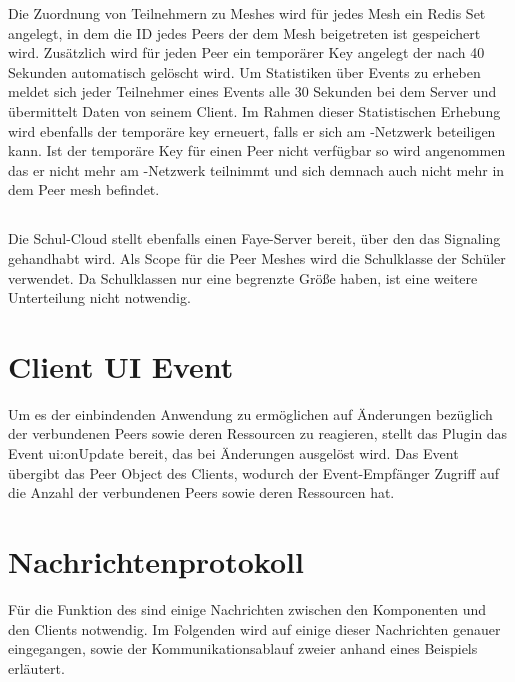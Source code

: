 \begin{description}
Die Zuordnung von Teilnehmern zu Meshes wird für jedes Mesh ein Redis Set angelegt, in dem die ID jedes Peers der dem Mesh beigetreten ist gespeichert wird. Zusätzlich wird für jeden Peer ein temporärer Key angelegt der nach 40 Sekunden automatisch gelöscht wird. Um Statistiken über Events zu erheben meldet sich jeder Teilnehmer eines Events alle 30 Sekunden bei dem Server und übermittelt Daten von seinem Client. Im Rahmen dieser Statistischen Erhebung wird ebenfalls der temporäre key erneuert, falls er sich am \pTp-Netzwerk beteiligen kann. Ist der temporäre Key für einen Peer nicht verfügbar so wird angenommen das er nicht mehr am \pTp-Netzwerk teilnimmt und sich demnach auch nicht mehr in dem Peer mesh befindet.

\subsection{\schulCloud}

Die Schul-Cloud stellt ebenfalls einen Faye-Server bereit, über den das Signaling gehandhabt wird. Als Scope für die Peer Meshes wird die Schulklasse der Schüler verwendet. Da Schulklassen nur eine begrenzte Größe haben, ist eine weitere Unterteilung nicht notwendig.


\section{Client UI Event}
Um es der einbindenden Anwendung zu ermöglichen auf Änderungen bezüglich der verbundenen Peers sowie deren Ressourcen zu reagieren, stellt das Plugin das Event ui:onUpdate bereit, das bei Änderungen ausgelöst wird. Das Event übergibt das Peer Object des Clients, wodurch der Event-Empfänger Zugriff auf die Anzahl der verbundenen Peers sowie deren Ressourcen hat. 

\section{Nachrichtenprotokoll}\label{i:Nachrichten}

Für die Funktion des \cdns sind einige Nachrichten zwischen den Komponenten und den Clients notwendig. Im Folgenden wird auf einige dieser Nachrichten genauer eingegangen, sowie der Kommunikationsablauf zweier \clients anhand eines Beispiels erläutert.


\end{description}
